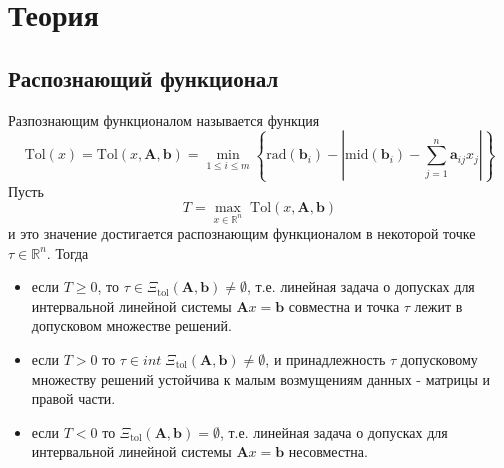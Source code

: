 \documentclass[a4paper,14pt]{article}
\begin{document}
	\section{Теория}
	\subsection{Распознающий функционал}
	Разпознающим функционалом называется функция
	\begin{equation}
		\mathrm{Tol}(x)=\mathrm{Tol}(x,\mathbf{A},\mathbf{b})=\min_{1\leq i\leq m}\left\{\mathrm{rad}(\mathbf{b}_i)-\left|\mathrm{mid}(\mathbf{b}_i)-\sum_{j=1}^n \mathbf{a}_{ij}x_j\right|\right\}
	\end{equation}
	Пусть
	\begin{equation}
		T=\max_{x\in \mathbb{R}^n} \;\mathrm{Tol}(x, \mathbf{A},\mathbf{b})
	\end{equation}
	и это значение достигается распознающим функционалом в некоторой точке $\tau\in \mathbb{R}^n$. Тогда
	\begin{itemize}
		\item если $T\geq0$, то $\tau\in\Xi_{\mathrm{tol}}(\textbf{A},\textbf{b})\neq  \emptyset$, т.е. линейная задача о допусках для интервальной линейной системы $\textbf{A}x=\textbf{b}$ совместна и точка $\tau$ лежит в допусковом множестве решений.
		\item если $T>0$ то $\tau\in int \;\Xi_{\mathrm{tol}}(\textbf{A},\textbf{b})\neq  \emptyset$, и принадлежность $\tau$ допусковому множеству решений устойчива к малым возмущениям данных - матрицы и правой части.
		\item если $T<0$ то $\Xi_{\mathrm{tol}}(\textbf{A},\textbf{b})=\emptyset$,  т.е. линейная задача о допусках для интервальной линейной системы $\textbf{A}x=\textbf{b}$ несовместна.
	\end{itemize}
\end{document}

